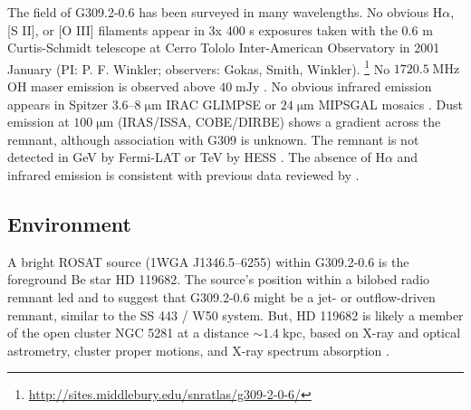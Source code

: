 \documentclass[preprint2,tighten,trackchanges]{aastex6}
\newcommand*{\mt}{\mathrm}
\newcommand*{\unit}[1]{\;\mt{#1}}  %
\newcommand*{\abt}{\mathord{\sim}} %
\newcommand*{\nH}{N_{\mathrm{H}}}
\begin{document}
The field of G309.2-0.6 has been surveyed in many wavelengths.
No obvious H$\alpha$, [S II], or [O III] filaments appear in 3x 400 s exposures
taken with the 0.6 m Curtis-Schmidt telescope at Cerro Tololo Inter-American
Observatory in 2001 January (PI: P. F. Winkler; observers: Gokas, Smith,
Winkler).
\footnote{\url{http://sites.middlebury.edu/snratlas/g309-2-0-6/}}
No $1720.5 \unit{MHz}$ OH maser emission is observed above $40 \unit{mJy}$
\citep{green1997}.
No obvious infrared emission appears in Spitzer
$3.6$--$8 \unit{{\mu}m}$ IRAC GLIMPSE or $24 \unit{{\mu}m}$ MIPSGAL mosaics
\citep{churchwell2009, carey2009}.
Dust emission at $100 \unit{{\mu}m}$ (IRAS/ISSA, COBE/DIRBE) shows a
gradient across the remnant, although association with G309 is unknown.
The remnant is not detected in GeV by Fermi-LAT \citep{acero2016} or TeV by
HESS \citep{bochow2011}.
The absence of H$\alpha$ and infrared emission is consistent with previous
data reviewed by .


\subsection{Environment}

A bright ROSAT source (1WGA J1346.5--6255) within G309.2-0.6 is the foreground
Be star HD 119682.
The source's position within a bilobed radio remnant led
 and  to suggest that
G309.2-0.6 might be a jet- or outflow-driven remnant, similar to the SS 443 /
W50 system.
But, HD 119682 is likely a member of the open cluster NGC 5281 at a distance
$\abt 1.4 \unit{kpc}$, based on X-ray and optical astrometry, cluster proper
motions, and X-ray spectrum absorption \citep{rakowski2006-star, safi-harb2007,
torrejon2013}.
\end{document}
